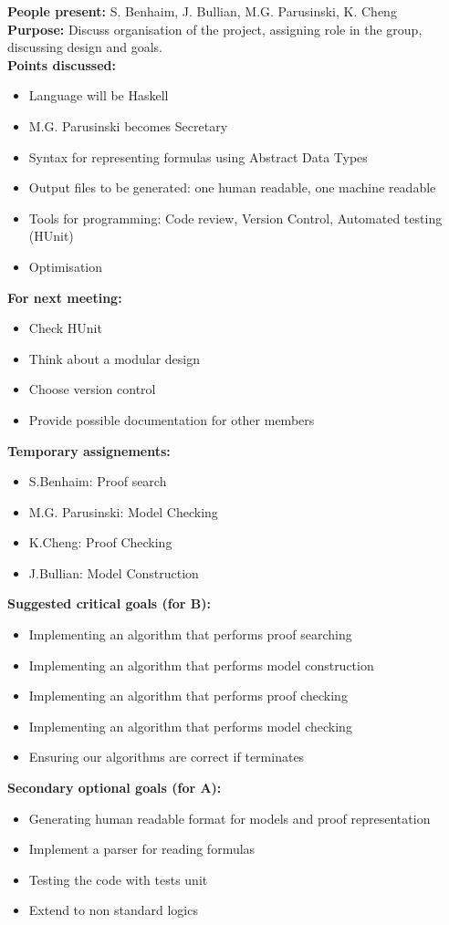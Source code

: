 \documentclass[12pt]{article}
\begin{document}
\textbf{People present:} S. Benhaim, J. Bullian, M.G. Parusinski, K. Cheng \\
\textbf{Purpose:} Discuss organisation of the project, assigning role in the group, discussing design and goals. \\
\textbf{Points discussed:}
\begin{itemize}
\item Language will be Haskell
\item M.G. Parusinski becomes Secretary
\item Syntax for representing formulas using Abstract Data Types
\item Output files to be generated: one human readable, one machine readable
\item Tools for programming: Code review, Version Control, Automated testing (HUnit)
\item Optimisation
\end{itemize}
\textbf{For next meeting:}
\begin{itemize}
\item Check HUnit
\item Think about a modular design
\item Choose version control
\item Provide possible documentation for other members
\end{itemize}
\textbf{Temporary assignements:}
\begin{itemize}
\item S.Benhaim: Proof search
\item M.G. Parusinski: Model Checking
\item K.Cheng: Proof Checking
\item J.Bullian: Model Construction
\end{itemize}
\textbf{Suggested critical goals (for B):} 
\begin{itemize}
\item Implementing an algorithm that performs proof searching
\item Implementing an algorithm that performs model construction
\item Implementing an algorithm that performs proof checking
\item Implementing an algorithm that performs model checking
\item Ensuring our algorithms are correct if terminates
\end{itemize}
\textbf{Secondary optional goals (for A):}
\begin{itemize}
\item Generating human readable format for models and proof representation
\item Implement a parser for reading formulas
\item Testing the code with tests unit
\item Extend to non standard logics
\end{itemize}
\end{document}
